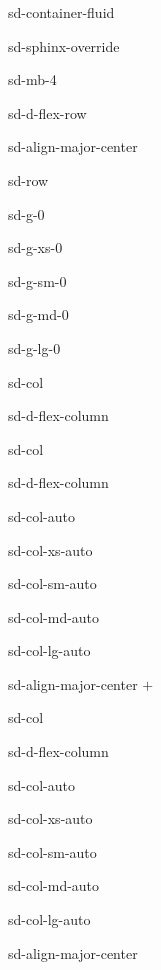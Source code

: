\documentclass[letterpaper,10pt,english]{jupyterBook}
\begin{document}
\begin{sphinxuseclass}{sd-container-fluid}
\begin{sphinxuseclass}{sd-sphinx-override}
\begin{sphinxuseclass}{sd-mb-4}
\begin{sphinxuseclass}{sd-d-flex-row}
\begin{sphinxuseclass}{sd-align-major-center}
\begin{sphinxuseclass}{sd-row}
\begin{sphinxuseclass}{sd-g-0}
\begin{sphinxuseclass}{sd-g-xs-0}
\begin{sphinxuseclass}{sd-g-sm-0}
\begin{sphinxuseclass}{sd-g-md-0}
\begin{sphinxuseclass}{sd-g-lg-0}
\begin{sphinxuseclass}{sd-col}
\begin{sphinxuseclass}{sd-d-flex-column}
\end{sphinxuseclass}
\end{sphinxuseclass}
\begin{sphinxuseclass}{sd-col}
\begin{sphinxuseclass}{sd-d-flex-column}
\begin{sphinxuseclass}{sd-col-auto}
\begin{sphinxuseclass}{sd-col-xs-auto}
\begin{sphinxuseclass}{sd-col-sm-auto}
\begin{sphinxuseclass}{sd-col-md-auto}
\begin{sphinxuseclass}{sd-col-lg-auto}
\begin{sphinxuseclass}{sd-align-major-center}
\sphinxAtStartPar
\(+\)

\end{sphinxuseclass}
\end{sphinxuseclass}
\end{sphinxuseclass}
\end{sphinxuseclass}
\end{sphinxuseclass}
\end{sphinxuseclass}
\end{sphinxuseclass}
\end{sphinxuseclass}
\begin{sphinxuseclass}{sd-col}
\begin{sphinxuseclass}{sd-d-flex-column}
\begin{sphinxuseclass}{sd-col-auto}
\begin{sphinxuseclass}{sd-col-xs-auto}
\begin{sphinxuseclass}{sd-col-sm-auto}
\begin{sphinxuseclass}{sd-col-md-auto}
\begin{sphinxuseclass}{sd-col-lg-auto}
\begin{sphinxuseclass}{sd-align-major-center}\begin{center}
\end{center}
\end{sphinxuseclass}
\end{sphinxuseclass}
\end{sphinxuseclass}
\end{sphinxuseclass}
\end{sphinxuseclass}
\end{sphinxuseclass}
\end{sphinxuseclass}
\end{sphinxuseclass}
\end{sphinxuseclass}
\end{sphinxuseclass}
\end{sphinxuseclass}
\end{sphinxuseclass}
\end{sphinxuseclass}
\end{sphinxuseclass}
\end{sphinxuseclass}
\end{sphinxuseclass}
\end{sphinxuseclass}
\end{sphinxuseclass}
\end{sphinxuseclass}
\end{document}
